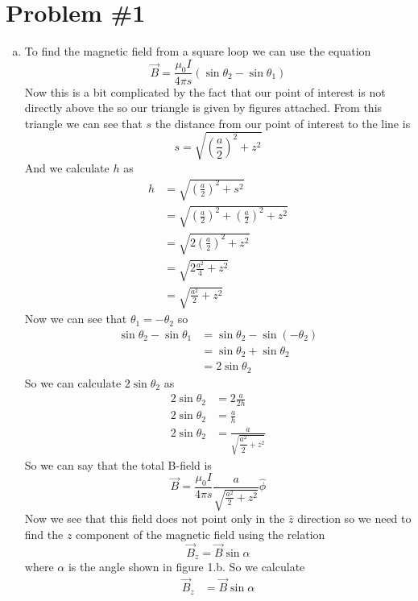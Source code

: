 \documentclass[11pt]{article}
\numberwithin{equation}{section}
\begin{document}


\section{Problem \#1}
\begin{enumerate}[(a)]
\item
To find the magnetic field from a square loop we can use the equation
\begin{equation}
\vec{B} = \frac{\mu_0 I}{4\pi s}\left(\sin\theta_2-\sin\theta_1\right)
\label{griff535}
\end{equation}
Now this is a bit complicated by the fact that our point of interest is not directly above the so our triangle is given by figures attached. From this triangle we can see that $s$ the distance from our point of interest to the line is 
$$s = \sqrt{\left(\frac{a}{2}\right)^2 + z^2}$$ 
And we calculate $h$ as
\begin{align*}
h &= \sqrt{\left(\frac{a}{2}\right)^2 + s^2}\\ 
&= \sqrt{\left(\frac{a}{2}\right)^2 + \left(\frac{a}{2}\right)^2 + z^2}\\ 
&= \sqrt{2\left(\frac{a}{2}\right)^2 +  z^2}\\ 
&= \sqrt{2\frac{a^2}{4} +  z^2}\\ 
&= \sqrt{\frac{a^2}{2} +  z^2}
\end{align*}
Now we can see that $\theta_1 = -\theta_2$ so 
\begin{align*}
\sin\theta_2-\sin\theta_1 &= \sin\theta_2-\sin(-\theta_2)\\
&= \sin\theta_2+\sin\theta_2\\
&= 2\sin\theta_2
\end{align*}
So we can calculate $2\sin\theta_2$ as
\begin{align*}
2\sin\theta_2 &= 2\frac{a}{2h}\\
2\sin\theta_2 &= \frac{a}{h}\\
2\sin\theta_2 &= \frac{a}{\sqrt{\dfrac{a^2}{2} + z^2}}
\end{align*}
So we can say that the total B-field is 
$$\vec{B} = \frac{\mu_0 I}{4\pi s}\frac{a}{\sqrt{\frac{a^2}{2} + z^2}}\hat{\phi}$$
Now we see that this field does not point only in the $\hat{z}$ direction so we need to find the $z$ component of the magnetic field using the relation
$$\vec{B}_z = \vec{B}\sin\alpha$$
where $\alpha$ is the angle shown in figure 1.b. So we calculate 
\begin{align*}
\vec{B}_z &= \vec{B}\sin\alpha\\

\end{align*}
\end{enumerate}
\end{document}
